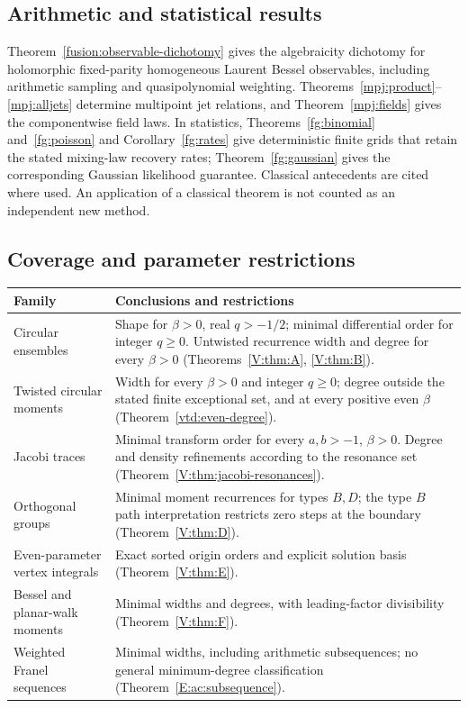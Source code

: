 \documentclass[11pt,a4paper]{article}
\theoremstyle{definition}
\theoremstyle{remark}
\numberwithin{equation}{section}
\begin{document}
\subsection*{Arithmetic and statistical results}
Theorem~\ref{fusion:observable-dichotomy} gives the algebraicity
dichotomy for holomorphic fixed-parity homogeneous Laurent Bessel
observables, including arithmetic sampling and quasipolynomial
weighting. Theorems~\ref{mpj:product}--\ref{mpj:alljets} determine
multipoint jet relations, and Theorem~\ref{mpj:fields} gives the
componentwise field laws. In statistics,
Theorems~\ref{fg:binomial} and~\ref{fg:poisson} and
Corollary~\ref{fg:rates} give deterministic finite grids that retain
the stated mixing-law recovery rates; Theorem~\ref{fg:gaussian}
gives the corresponding Gaussian likelihood guarantee.
Classical antecedents are cited where used. An application of a
classical theorem is not counted as an independent new method.

\subsection*{Coverage and parameter restrictions}
\begin{center}\small
\renewcommand{\arraystretch}{1.2}
\begin{tabular}{@{}>{\raggedright\arraybackslash}p{}>{\raggedright\arraybackslash}p{}@{}}
\toprule
Family & Conclusions and restrictions\\
\midrule
Circular ensembles & Shape for $\beta>0$, real $q>-1/2$; minimal
differential order for integer $q\ge0$. Untwisted recurrence width
and degree for every $\beta>0$ (Theorems~\ref{V:thm:A}, \ref{V:thm:B}).\\
Twisted circular moments & Width for every $\beta>0$ and integer
$q\ge0$; degree outside the stated finite exceptional set, and at
every positive even $\beta$ (Theorem~\ref{vtd:even-degree}).\\
Jacobi traces & Minimal transform order for every $a,b>-1$, $\beta>0$.
Degree and density refinements according to the resonance set
(Theorem~\ref{V:thm:jacobi-resonances}).\\
Orthogonal groups & Minimal moment recurrences for types $B,D$;
the type $B$ path interpretation restricts zero steps at the boundary
(Theorem~\ref{V:thm:D}).\\
Even-parameter vertex integrals & Exact sorted origin orders and
explicit solution basis (Theorem~\ref{V:thm:E}).\\
Bessel and planar-walk moments & Minimal widths and degrees, with
leading-factor divisibility (Theorem~\ref{V:thm:F}).\\
Weighted Franel sequences & Minimal widths, including arithmetic
subsequences; no general minimum-degree classification
(Theorem~\ref{E:ac:subsequence}).\\
\bottomrule
\end{tabular}
\end{center}
\end{document}
